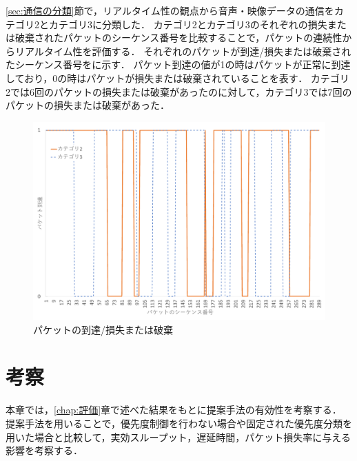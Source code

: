 \documentclass[a4paper,11pt,uplatex]{ujreport}
\begin{document}
  \ref{sec:通信の分類}節で，リアルタイム性の観点から音声・映像データの通信をカテゴリ2とカテゴリ3に分類した．
  カテゴリ2とカテゴリ3のそれぞれの損失または破棄されたパケットのシーケンス番号を比較することで，パケットの連続性からリアルタイム性を評価する．
  それぞれのパケットが到達/損失または破棄されたシーケンス番号をに示す．
  パケット到達の値が1の時はパケットが正常に到達しており，0の時はパケットが損失または破棄されていることを表す．
  カテゴリ2では6回のパケットの損失または破棄があったのに対して，カテゴリ3では7回のパケットの損失または破棄があった．

  \begin{figure}[!b]
    \centering
    \includegraphics[width=0.85\linewidth]{img/realtime.pdf}
    \caption{パケットの到達/損失または破棄}
    \label{fig:realtime}
  \end{figure}


\chapter{考察}
\label{chap:考察}

  本章では，\ref{chap:評価}章で述べた結果をもとに提案手法の有効性を考察する．
  提案手法を用いることで，優先度制御を行わない場合や固定された優先度分類を用いた場合と比較して，実効スループット，遅延時間，パケット損失率に与える影響を考察する．\par
\end{document}
